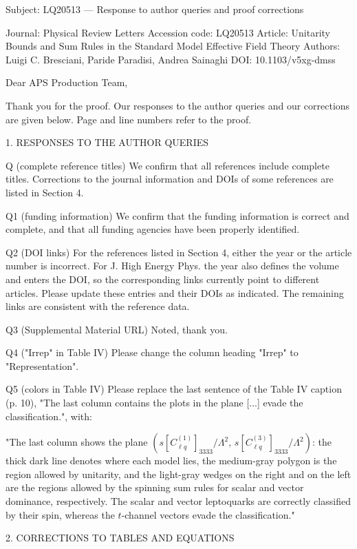 Subject: LQ20513 — Response to author queries and proof corrections

Journal: Physical Review Letters
Accession code: LQ20513
Article: Unitarity Bounds and Sum Rules in the Standard Model Effective Field Theory
Authors: Luigi C. Bresciani, Paride Paradisi, Andrea Sainaghi
DOI: 10.1103/v5xg-dmss

Dear APS Production Team,

Thank you for the proof. Our responses to the author queries and our
corrections are given below. Page and line numbers refer to the proof.


1. RESPONSES TO THE AUTHOR QUERIES

Q (complete reference titles)
We confirm that all references include complete titles. Corrections to the
journal information and DOIs of some references are listed in Section 4.

Q1 (funding information)
We confirm that the funding information is correct and complete, and that
all funding agencies have been properly identified.

Q2 (DOI links)
For the references listed in Section 4, either the year or the article
number is incorrect. For J. High Energy Phys. the year also defines the
volume and enters the DOI, so the corresponding links currently point to
different articles. Please update these entries and their DOIs as
indicated. The remaining links are consistent with the reference data.

Q3 (Supplemental Material URL)
Noted, thank you.

Q4 ("Irrep" in Table IV)
Please change the column heading "Irrep" to "Representation".

Q5 (colors in Table IV)
Please replace the last sentence of the Table IV caption (p. 10), "The last
column contains the plots in the plane [...] evade the classification.",
with:

"The last column shows the plane $(s[C^{(1)}_{\ell q}]_{3333}/\Lambda^2,\, s[C^{(3)}_{\ell q}]_{3333}/\Lambda^2)$: the thick dark line denotes where each model lies, the medium-gray polygon is the region allowed by unitarity, and the light-gray wedges on the right and on the left are the regions allowed by the spinning sum rules for scalar and vector dominance, respectively. The scalar and vector leptoquarks are correctly classified by their spin, whereas the $t$-channel vectors evade the classification."


2. CORRECTIONS TO TABLES AND EQUATIONS


